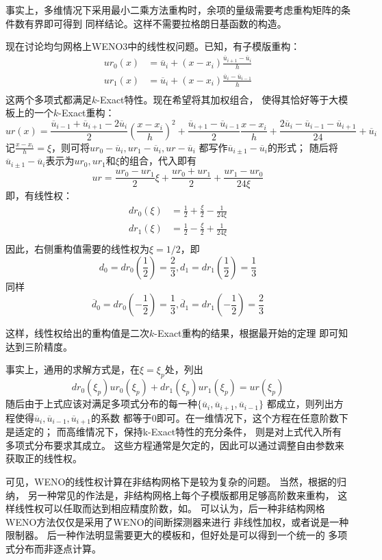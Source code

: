 \documentclass[UTF8,zihao=5]{ctexart} %
\newcommand*{\mean}[1]{\overline{#1}}
\begin{document}
事实上，多维情况下采用最小二乘方法重构时，余项的量级需要考虑重构矩阵的条件数有界即可得到
同样结论。这样不需要拉格朗日基函数的构造。

现在讨论均匀网格上WENO3中的线性权问题。已知，有子模版重构：
$$
\begin{aligned}
    ur_0(x) &= \mean{u}_i + (x-x_i) \frac{\mean{u}_{i+1}-\mean{u}_{i}}{h}\\
    ur_1(x) &= \mean{u}_i + (x-x_i) \frac{\mean{u}_{i}-\mean{u}_{i-1}}{h}\\
\end{aligned}
$$
这两个多项式都满足$k$-Exact特性。现在希望将其加权组合，
使得其恰好等于大模板上的一个$k$-Exact重构：
$$
ur(x) = 
\frac{\mean{u}_{i-1}+\mean{u}_{i+1}-2\mean{u}_{i}}{2}\left(\frac{x-x_i}{h}\right)^2
+
\frac{\mean{u}_{i+1}-\mean{u}_{i-1}}{2}\frac{x-x_i}{h}
+\frac{2\mean{u}_{i}-\mean{u}_{i-1}-\mean{u}_{i+1}}{24} + \mean{u}_i
$$
记$\frac{x-x_i}{h} = \xi$，则可将$ur_0-\mean{u}_i,ur_1-\mean{u}_i,ur-\mean{u}_i$
都写作$\mean{u}_{i\pm1}-\mean{u}_i$的形式；
随后将$\mean{u}_{i\pm1}-\mean{u}_i$表示为$ur_0,ur_1$和$\xi$的组合，代入即有
$$
ur = 
\frac{ur_0 - ur_1}{2}\xi
+
\frac{ur_0 + ur_1}{2}
+\frac{ur_1-ur_0}{24 \xi} 
$$
即，有线性权：
$$
\begin{aligned}
    dr_0(\xi) &= \frac{1}{2} + \frac{\xi}{2}  - \frac{1}{24\xi}\\
    dr_1(\xi) &= \frac{1}{2} - \frac{\xi}{2}  + \frac{1}{24\xi}\\
\end{aligned}
$$
因此，右侧重构值需要的线性权为$\xi=1/2$，即
$$
d_0=dr_0(\frac{1}{2})=\frac{2}{3}, d_1=dr_1(\frac{1}{2})=\frac{1}{3}
$$
同样
$$
\overline{d}_0=dr_0(-\frac{1}{2})=\frac{1}{3}, \overline{d}_1=dr_1(-\frac{1}{2})=\frac{2}{3}
$$

这样，线性权给出的重构值是二次$k$-Exact重构的结果，根据最开始的定理
即可知达到三阶精度。

事实上，通用的求解方式是，在$\xi = \xi_p$处，列出
$$
dr_0(\xi_p)ur_0(\xi_p) + dr_1(\xi_p)ur_1(\xi_p) = ur(\xi_p)
$$
随后由于上式应该对满足多项式分布的每一种$\{\mean{u}_i,\mean{u}_{i+1},\mean{u}_{i-1}\}$
都成立，则列出方程使得$\mean{u}_i,\mean{u}_{i-1},\mean{u}_{i+1}$的系数
都等于0即可。在一维情况下，这个方程在任意阶数下是适定的；
而高维情况下，保持k-Exact特性的充分条件，
则是对上式代入所有多项式分布要求其成立。
这些方程通常是欠定的，因此可以通过调整自由参数来获取正的线性权\cite{hu1999weighted}。

可见，WENO的线性权计算在非结构网格下是较为复杂的问题。
当然，根据\cite{liu2013robust}的归纳，
另一种常见的作法是，非结构网格上每个子模版都用足够高阶数来重构，
这样线性权可以任取而达到相应精度阶数，如\cite{friedrich1998weighted}。
可以认为，后一种非结构网格WENO方法仅仅是采用了WENO的间断探测器来进行
非线性加权，或者说是一种限制器。
后一种作法明显需要更大的模板和，但好处是可以得到一个统一的
多项式分布而非逐点计算。
\end{document}
